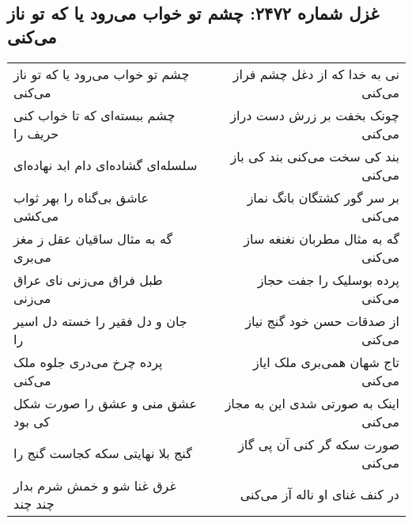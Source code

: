 \begin{center}
\section*{غزل شماره ۲۴۷۲: چشم تو خواب می‌رود یا که تو ناز می‌کنی}
\label{sec:2472}
\begin{longtable}{l p{0.5cm} r}
چشم تو خواب می‌رود یا که تو ناز می‌کنی
&&
نی به خدا که از دغل چشم فراز می‌کنی
\\
چشم ببسته‌ای که تا خواب کنی حریف را
&&
چونک بخفت بر زرش دست دراز می‌کنی
\\
سلسله‌ای گشاده‌ای دام ابد نهاده‌ای
&&
بند کی سخت می‌کنی بند کی باز می‌کنی
\\
عاشق بی‌گناه را بهر ثواب می‌کشی
&&
بر سر گور کشتگان بانگ نماز می‌کنی
\\
گه به مثال ساقیان عقل ز مغز می‌بری
&&
گه به مثال مطربان نغنغه ساز می‌کنی
\\
طبل فراق می‌زنی نای عراق می‌زنی
&&
پرده بوسلیک را جفت حجاز می‌کنی
\\
جان و دل فقیر را خسته دل اسیر را
&&
از صدقات حسن خود گنج نیاز می‌کنی
\\
پرده چرخ می‌دری جلوه ملک می‌کنی
&&
تاج شهان همی‌بری ملک ایاز می‌کنی
\\
عشق منی و عشق را صورت شکل کی بود
&&
اینک به صورتی شدی این به مجاز می‌کنی
\\
گنج بلا نهایتی سکه کجاست گنج را
&&
صورت سکه گر کنی آن پی گاز می‌کنی
\\
غرق غنا شو و خمش شرم بدار چند چند
&&
در کنف غنای او ناله آز می‌کنی
\\
\end{longtable}
\end{center}
